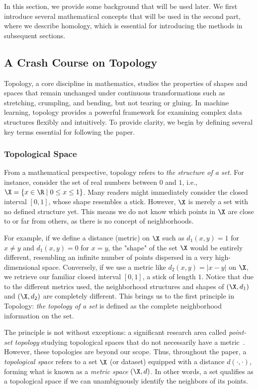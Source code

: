 
In this section, we provide some background that will be used later. We first introduce several mathematical concepts that will be used in the second part, where we describe homology, which is essential for introducing the methods in subsequent sections.


\subsection{A Crash Course on Topology} \label{sec:topology}

Topology, a core discipline in mathematics, studies the properties of shapes and spaces that remain unchanged under continuous transformations such as stretching, crumpling, and bending, but not tearing or gluing. In machine learning, topology provides a powerful framework for examining complex data structures flexibly and intuitively. To provide clarity, we begin by defining several key terms essential for following the paper.

\subsubsection{Topological Space} From a mathematical perspective, topology refers to \textit{the structure of a set}. For instance, consider the set of real numbers between $0$ and $1$, i.e., $\X = \{x\in\R \mid 0 \leq x \leq 1\}$. Many readers might immediately consider the closed interval $[0,1]$, whose shape resembles a stick. However, $\X$ is merely a set with no defined structure yet. This means we do not know which points in $\X$ are close to or far from others, as there is no concept of neighborhoods.

For example, if we define a distance (metric) on $\X$ such as $d_1(x, y) = 1$ for $x \neq y$ and $d_1(x, y) = 0$ for $x = y$, the "shape" of the set $\X$ would be entirely different, resembling an infinite number of points dispersed in a very high-dimensional space. Conversely, if we use a metric like $d_2(x, y) = |x - y|$ on $\X$, we retrieve our familiar closed interval $[0,1]$, a stick of length $1$. Notice that due to the different metrics used, the neighborhood structures and shapes of $(\X, d_1)$ and $(\X, d_2)$ are completely different. This brings us to the first principle in Topology: \textit{the topology of a set} is defined as the complete neighborhood information on the set.  

The principle is not without exceptions: a significant research area called \textit{point-set topology} studying topological spaces that do not necessarily have a metric~\cite{lopez2024point,goubault2013non}. However, these topologies are beyond our scope. Thus, throughout the paper, a \textit{topological space} refers to a set $\X$ (or dataset) equipped with a distance $d(\cdot,\cdot)$, forming what is known as a \textit{metric space} $(\X,d)$. In other words, a set qualifies as a topological space if we can unambiguously identify the neighbors of its points. 



